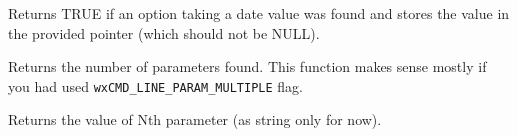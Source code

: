 \label{wxcmdlineparserfounddateoption}


Returns TRUE if an option taking a date value was found and stores the
value in the provided pointer (which should not be NULL).

\label{wxcmdlineparsergetparamcount}


Returns the number of parameters found. This function makes sense mostly if you
had used {\tt wxCMD\_LINE\_PARAM\_MULTIPLE} flag.

\label{wxcmdlineparsergetparam}


Returns the value of Nth parameter (as string only for now).




